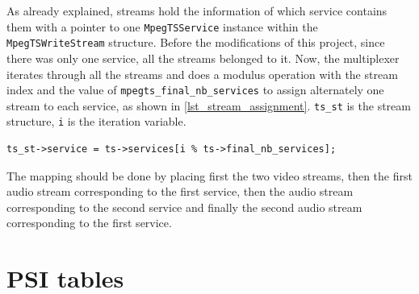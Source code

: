 \documentclass[
	12pt,				%
	openright,			%
	twoside,			%
	a4paper,			%
	brazil,
	french,				%
	english
	]{abntex2}
\begin{document}
As already explained, streams hold the information of which service contains them with a pointer to one \texttt{MpegTSService} instance within the \texttt{MpegTSWriteStream} structure. Before the modifications of this project, since there was only one service, all the streams belonged to it. Now, the multiplexer iterates through all the streams and does a modulus operation with the stream index and the value of \texttt{mpegts\hspace{0.1mm}\_\hspace{0.1mm}final\hspace{0.1mm}\_\hspace{0.1mm}nb\hspace{0.1mm}\_\hspace{0.1mm}services} to assign alternately one stream to each service, as shown in \autoref{lst_stream_assignment}. \texttt{ts\hspace{0.1mm}\_\hspace{0.1mm}st} is the stream structure, \texttt{i} is the iteration variable.

\begin{minipage}{\linewidth}
\begin{lstlisting}[caption={Assigning streams to services.}, label={lst_stream_assignment}]
ts_st->service = ts->services[i % ts->final_nb_services];
\end{lstlisting}
\end{minipage}

The mapping should be done by placing first the two video streams, then the first audio stream corresponding to the first service, then the audio stream corresponding to the second service and finally the second audio stream corresponding to the first service.

\section{PSI tables}
\end{document}
